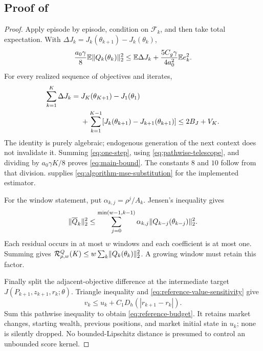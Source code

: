 \documentclass[11pt]{article}
\newcommand{\E}{\mathbb E}
\newcommand{\1}{\mathbf 1}
\DeclarePairedDelimiter{\norm}{\lVert}{\rVert}
\newcommand{\cF}{\mathcal F}
\newcommand{\Reg}{\mathcal R}
\theoremstyle{definition}
\begin{document}
\subsection{Proof of \texorpdfstring{}{the online residual theorem}}
\begin{proof}
Apply  episode by episode, condition on $\cF_k$, and then take total expectation. With $\Delta J_k=J_k(\theta_{k+1})-J_k(\theta_k)$,
\begin{equation}\label{eq:one-step}
 \frac{a_0\gamma}{8}\E\norm{Q_k(\theta_k)}_2^2
 \le\E\Delta J_k+\frac{5C_g\gamma}{4a_0^2}\E e_k^2.
\end{equation}
For every realized sequence of objectives and iterates,
\begin{align}
 \sum_{k=1}^K\Delta J_k
 ={}&J_K(\theta_{K+1})-J_1(\theta_1)\notag\\
 &+\sum_{k=1}^{K-1}
 [J_k(\theta_{k+1})-J_{k+1}(\theta_{k+1})]
 \le2B_J+V_K.
 \label{eq:pathwise-telescope}
\end{align}
The identity is purely algebraic; endogenous generation of the next context does not invalidate it. Summing \eqref{eq:one-step}, using \eqref{eq:pathwise-telescope}, and dividing by $a_0\gamma K/8$ proves \eqref{eq:main-bound}. The constants $8$ and $10$ follow from that division.  supplies \eqref{eq:algorithm-mse-substitution} for the implemented estimator.

For the window statement, put $\alpha_{k,j}=\rho^j/A_k$. Jensen's inequality gives
\[
 \norm{\overline Q_k}_2^2
 \le\sum_{j=0}^{\min(w-1,k-1)}\alpha_{k,j}
 \norm{Q_{k-j}(\theta_{k-j})}_2^2.
\]
Each residual occurs in at most $w$ windows and each coefficient is at most one. Summing gives $\Reg_{\rho,w}^Q(K)\le w\sum_k\norm{Q_k(\theta_k)}_2^2$. A growing window must retain this factor.

Finally split the adjacent-objective difference at the intermediate target $J(P_{k+1},z_{k+1},r_k;\theta)$. Triangle inequality and \eqref{eq:reference-value-sensitivity} give
\[
 v_k\le u_k+C_1D_h(|r_{k+1}-r_k|).
\]
Sum this pathwise inequality to obtain \eqref{eq:reference-budget}. It retains market changes, starting wealth, previous positions, and market initial state in $u_k$; none is silently dropped. No bounded-Lipschitz distance is presumed to control an unbounded score kernel.
\end{proof}
\end{document}
